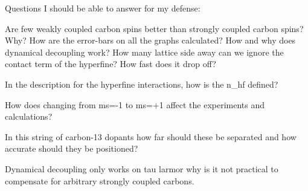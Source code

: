 Questions I should be able to answer for my defense:

Are few weakly coupled carbon spins better than strongly coupled carbon spins? Why?
How are the error-bars on all the graphs calculated?
How and why does dynamical decoupling work?
How many lattice side away can we ignore the contact term of the hyperfine? How fast does it drop off?

In the description for the hyperfine interactions, how is the n_hf defined?

How does changing from ms=-1 to ms=+1 affect the experiments and calculations?

In this string of carbon-13  dopants how far should these be separated and how accurate should they be positioned?

Dynamical decoupling only works on tau larmor
why is it not practical to compensate for arbitrary strongly coupled carbons.
